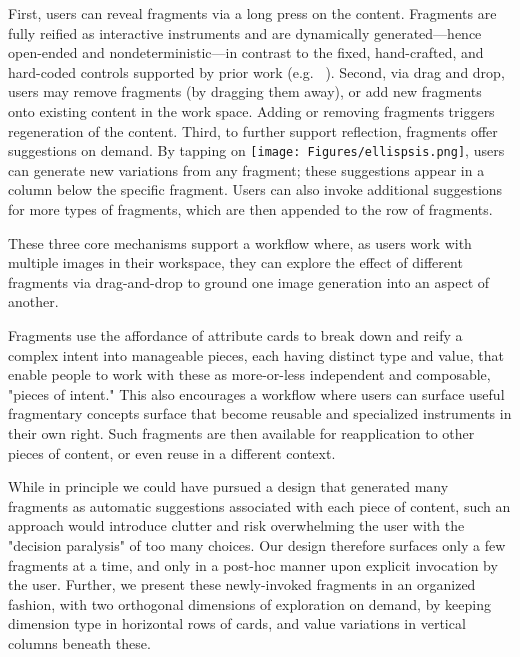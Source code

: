  First, users can reveal fragments via a long press on the content. Fragments are fully reified as interactive instruments and are dynamically generated---hence open-ended and nondeterministic---in contrast to the fixed, hand-crafted, and hard-coded controls supported by prior work (e.g. ~\cite{xia2016object, TerryCreativeNeedsUIDesign2002, Suggestive3dDrawing2007, WritLarge2017}). 
 Second, via drag and drop, users may remove fragments (by dragging them away), or add new fragments onto existing content in the work space. Adding or removing fragments triggers regeneration of the content. 
 Third, to further support reflection, fragments offer suggestions on demand. By tapping on \texttt{[image: Figures/ellispsis.png]}, users can generate new variations from any fragment; these suggestions appear in a column below the specific fragment. Users can also invoke additional suggestions for more types of fragments, which are then appended to the row of fragments. 
 
These three core mechanisms support a workflow where, as users work with multiple images in their workspace, they can explore the effect of different fragments via drag-and-drop to ground one image generation into an aspect of another.
 

Fragments use the affordance of attribute cards to break down and reify a complex intent into manageable pieces, each having distinct type and value, that enable people to work with these as more-or-less independent and composable, "pieces of intent." This also encourages a workflow where users can surface useful fragmentary concepts surface that become reusable and specialized instruments in their own right. Such fragments are then available for reapplication to other pieces of content, or even reuse in a different context.

While in principle we could have pursued a design that generated many fragments as automatic suggestions associated with each piece of content, such an approach would introduce clutter and risk overwhelming the user with the "decision paralysis" of too many choices. Our design therefore surfaces only a few fragments at a time, and only in a post-hoc manner upon explicit invocation by the user. Further, we present these newly-invoked fragments in an organized fashion, with two orthogonal dimensions of exploration on demand, by keeping dimension type in horizontal rows of cards, and value variations in vertical columns beneath these.



